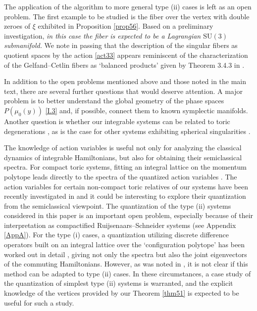 \documentclass[a4paper,11pt,reqno]{amsart}
\theoremstyle{definition}
\numberwithin{equation}{section}
\def\SU{\mathrm{SU}}                        %
\begin{document}
The application of the algorithm to more general type (ii) cases is left as an open problem.
 The first example to be studied is the fiber over the vertex with double zeroes of $\xi$
exhibited in  Proposition \ref{prop56}. Based on a preliminary investigation,
\emph{in this case the fiber is expected to be a Lagrangian $\SU(3)$ submanifold.}
 We note in passing that the description of the singular fibers as quotient spaces by the action \eqref{act33}
appears reminiscent of the characterization of the Gelfand--Cetlin fibers as `balanced products'
given by Theorem 3.4.3 in \cite{CL}.


In addition to the open problems mentioned above and those noted in the main text,
there are several further questions that would deserve attention.
A major problem is to better understand  the global geometry of the
phase spaces $P(\mu_0(y))$ \eqref{I.3} and, if possible, connect them to known
symplectic  manifolds.
Another  question is whether our integrable systems can be related to
toric degenerations \cite{HK}, as is the case for other systems exhibiting spherical
singularities \cite{NNU,NU-pol}.


The knowledge of action variables is useful not only for analyzing the classical dynamics of integrable Hamiltonians, but also
for obtaining their semiclassical spectra.  For compact toric systems, fitting an integral lattice on the momentum polytope
leads directly to the spectra of the quantized action variables \cite{FKlim2,Ham}.
 The action variables for certain non-compact toric \cite{KL} relatives of our systems have been recently
investigated in \cite{LMRS} and it could be interesting to explore their quantization from the semiclassical viewpoint.
The quantization of the  type (ii)  systems considered in this paper is  an important open problem, especially
because of their interpretation as compactified Ruijsenaars--Schneider systems (see Appendix \ref{AppA}).
 For the type (i) cases,
 a quantization utilizing discrete difference operators built on an integral lattice over the `configuration polytope'
has been worked out   in detail \cite{vDV,GH},  giving not only the spectra but also the joint eigenvectors
of the commuting Hamiltonians.
However, as was noted in \cite{GH},  it is not clear if  this method can be adapted to type (ii) cases.
In these circumstances, a case study of the  quantization of simplest type (ii) systems is warranted,
and the explicit knowledge of the vertices  provided by our Theorem \ref{thm51}
is expected to be useful for such a study.
\end{document}
